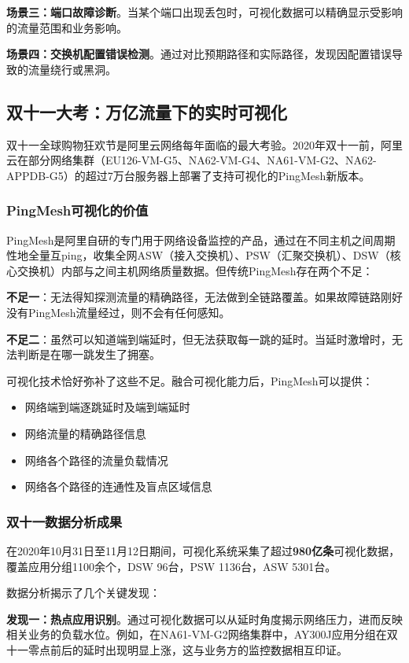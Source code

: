 \textbf{场景三：端口故障诊断}。当某个端口出现丢包时，可视化数据可以精确显示受影响的流量范围和业务影响。

\textbf{场景四：交换机配置错误检测}。通过对比预期路径和实际路径，发现因配置错误导致的流量绕行或黑洞。

\subsection{双十一大考：万亿流量下的实时可视化}

双十一全球购物狂欢节是阿里云网络每年面临的最大考验。2020年双十一前，阿里云在部分网络集群（EU126-VM-G5、NA62-VM-G4、NA61-VM-G2、NA62-APPDB-G5）的超过7万台服务器上部署了支持可视化的PingMesh新版本。

\subsubsection{PingMesh可视化的价值}

PingMesh是阿里自研的专门用于网络设备监控的产品，通过在不同主机之间周期性地全量互ping，收集全网ASW（接入交换机）、PSW（汇聚交换机）、DSW（核心交换机）内部与之间主机网络质量数据。但传统PingMesh存在两个不足：

\textbf{不足一}：无法得知探测流量的精确路径，无法做到全链路覆盖。如果故障链路刚好没有PingMesh流量经过，则不会有任何感知。

\textbf{不足二}：虽然可以知道端到端延时，但无法获取每一跳的延时。当延时激增时，无法判断是在哪一跳发生了拥塞。

可视化技术恰好弥补了这些不足。融合可视化能力后，PingMesh可以提供：
\begin{itemize}
    \item 网络端到端逐跳延时及端到端延时
    \item 网络流量的精确路径信息
    \item 网络各个路径的流量负载情况
    \item 网络各个路径的连通性及盲点区域信息
\end{itemize}

\subsubsection{双十一数据分析成果}

在2020年10月31日至11月12日期间，可视化系统采集了超过\textbf{980亿条}可视化数据，覆盖应用分组1100余个，DSW 96台，PSW 1136台，ASW 5301台。

数据分析揭示了几个关键发现：

\textbf{发现一：热点应用识别}。通过可视化数据可以从延时角度揭示网络压力，进而反映相关业务的负载水位。例如，在NA61-VM-G2网络集群中，AY300J应用分组在双十一零点前后的延时出现明显上涨，这与业务方的监控数据相互印证。

